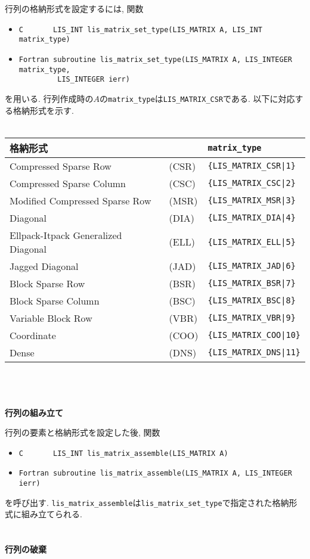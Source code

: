 \documentclass[a4paper]{jarticle}
\begin{document}
{{行列の格納形式を設定するには, 関数
\begin{itemize}
\item \verb|C       LIS_INT lis_matrix_set_type(LIS_MATRIX A, LIS_INT matrix_type)|
\item \verb|Fortran subroutine lis_matrix_set_type(LIS_MATRIX A, LIS_INTEGER matrix_type,|\\
      \verb|         LIS_INTEGER ierr)|
\end{itemize}
を用いる. 
行列作成時の$A$の\verb|matrix_type|は\verb|LIS_MATRIX_CSR|である.
以下に対応する格納形式を示す. 
\\ \\
\begin{minipage}[t]{\textwidth}
\begin{center}
\begin{tabular}{lll}\hline\hline
格納形式  & & \verb|matrix_type| \\ \hline
Compressed Sparse Row & (CSR) & \verb={LIS_MATRIX_CSR|1}= \\
Compressed Sparse Column & (CSC) & \verb={LIS_MATRIX_CSC|2}= \\
Modified Compressed Sparse Row & (MSR) & \verb={LIS_MATRIX_MSR|3}= \\
Diagonal &(DIA) & \verb={LIS_MATRIX_DIA|4}= \\
Ellpack-Itpack Generalized Diagonal &(ELL) & \verb={LIS_MATRIX_ELL|5}= \\
Jagged Diagonal &(JAD) & \verb={LIS_MATRIX_JAD|6}= \\
Block Sparse Row & (BSR) & \verb={LIS_MATRIX_BSR|7}= \\
Block Sparse Column &(BSC) & \verb={LIS_MATRIX_BSC|8}= \\
Variable Block Row &(VBR) & \verb={LIS_MATRIX_VBR|9}= \\
Coordinate & (COO) & \verb={LIS_MATRIX_COO|10}= \\
Dense &	(DNS) & \verb={LIS_MATRIX_DNS|11}= \\
\hline         
\end{tabular}
\end{center}
\end{minipage}
\\ \\ \\
\noindent
{\bf 行列の組み立て}

行列の要素と格納形式を設定した後, 関数
\begin{itemize}
\item \verb|C       LIS_INT lis_matrix_assemble(LIS_MATRIX A)|
\item \verb|Fortran subroutine lis_matrix_assemble(LIS_MATRIX A, LIS_INTEGER ierr)|
\end{itemize}
を呼び出す. 
\verb|lis_matrix_assemble|は\verb|lis_matrix_set_type|で指定された格納形式に組み立てられる. 
\\ \\ \\
\noindent
{\bf 行列の破棄}

}}
\end{document}

